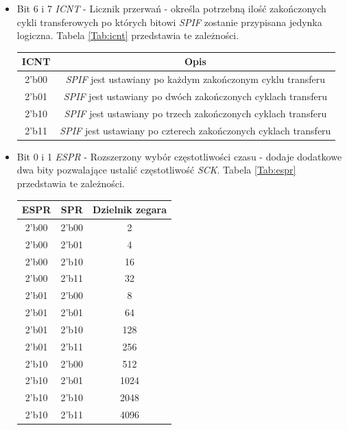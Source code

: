 \documentclass[11pt,a4paper]{article}
\begin{document}
\begin{itemize}
	\item Bit 6 i 7 \textit{ICNT} - Licznik przerwań - określa potrzebną ilość zakończonych cykli transferowych po których bitowi \textit{SPIF} zostanie przypisana jedynka logiczna. Tabela \ref{Tab:icnt} przedstawia te zależności.
			\\
 \begin{minipage}{\textwidth}
		 \begin{center}
				\begin{tabular}{|c|c|}
					\hline
					ICNT & Opis \\ 
					\hline
					2'b00 & \textit{SPIF} jest ustawiany po każdym zakończonym cyklu transferu \\
					\hline
					2'b01 & \textit{SPIF} jest ustawiany po dwóch zakończonych cyklach transferu \\
				\hline
					2'b10 & \textit{SPIF} jest ustawiany po trzech zakończonych cyklach transferu \\
					\hline
					2'b11 & \textit{SPIF} jest ustawiany po czterech zakończonych cyklach transferu \\
					\hline
				\end{tabular}
		\end{center}
		\end{minipage}	
	\item Bit 0 i 1 \textit{ESPR} - Rozszerzony wybór częstotliwości czasu - dodaje dodatkowe dwa bity pozwalające ustalić częstotliwość \textit{SCK}. Tabela \ref{Tab:espr} przedstawia te zależności.
				\\
 \begin{minipage}{\textwidth}
		 \begin{center}
				\begin{tabular}{|c|c|c|}
					\hline
					ESPR & SPR & Dzielnik zegara \\ 
					\hline
					2'b00 & 2'b00 & 2\\
					\hline
					2'b00 & 2'b01 & 4\\
					\hline
					2'b00 & 2'b10 & 16\\
					\hline
					2'b00 & 2'b11 & 32\\
					\hline
					2'b01 & 2'b00 & 8\\
					\hline
					2'b01 & 2'b01 & 64\\
					\hline
					2'b01 & 2'b10 & 128\\
					\hline
					2'b01 & 2'b11 & 256\\
					\hline
					2'b10 & 2'b00 & 512\\
					\hline
					2'b10 & 2'b01 & 1024\\
					\hline
					2'b10 & 2'b10 & 2048\\
					\hline
					2'b10 & 2'b11 & 4096\\
					\hline
				\end{tabular}
		\end{center}
		\end{minipage}
\end{itemize} 
\end{document}
